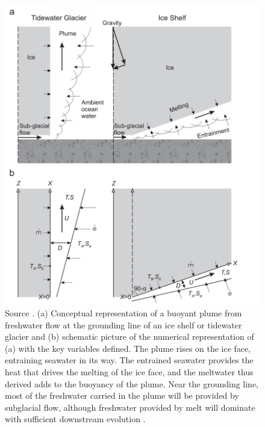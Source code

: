 \documentclass[11pt,a4paper]{article}
\begin{document}
	
	\begin{figure}[H]
	    \centering 
	    \includegraphics[width=12cm]{plumeD.png}
	    \caption{Source \cite{jenkins2011convection}. (a) Conceptual representation of a buoyant plume from freshwater flow at the grounding line of an ice shelf or tidewater glacier and (b) schematic picture of the numerical representation of (a) with the key variables defined. The plume rises on the ice face, entraining seawater in its way. The entrained seawater provides the heat that drives the melting of the ice face, and the meltwater thus derived adds to the buoyancy of the plume. Near the grounding line, most of the freshwater carried in the plume will be provided by subglacial flow, although freshwater provided by melt will dominate with sufficient downstream evolution \citep{jenkins2011convection}.}
	    \label{fig:3}
	\end{figure}
	
	
	
\end{document}
